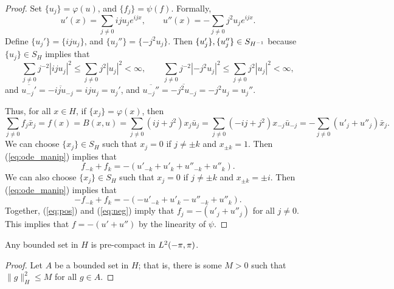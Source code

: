 \documentclass{homework}
\begin{document}
\begin{arabicparts}
\begin{proof}
			Set $\{u_j\} = \varphi(u)$, and $\{f_j\} = \psi(f)$. Formally,
			\begin{equation}
				\label{eq:formal_deriv}
				u'(x) = \sum_{j\ne0}iju_je^{ijx}, \qquad u''(x) = -\sum_{j\ne0}j^2u_je^{ijx}.
			\end{equation}
			Define $\{u_j'\} = \{iju_j\}$, and $\{u_j''\} = \{-j^2u_j\}$. Then $\{u_j'\}, \{u_j''\} \in S_{H^{-1}}$ because $\{u_j\} \in S_H$ implies that
			\begin{equation}
				\sum_{j\ne0}j^{-2}|iju_j|^2 \le \sum_{j\ne0} j^2|u_j|^2 < \infty, \qquad \sum_{j\ne0}j^{-2}|-j^2u_j|^2 \le \sum_{j\ne0}j^2|u_j|^2 < \infty,
			\end{equation}
			and $\overline{u_{-j}'} = \overline{-iju_{-j}} =iju_j=u_j'$, and $\overline{u_{-j}''} = \overline{-j^2u_{-j}} = -j^2u_j = u_j''$.
			
			Thus, for all $x\in H$, if $\{x_j\} = \varphi(x)$, then
			\begin{equation}
				\label{eq:ode_manip}
				 \sum_{j\ne0}f_j\bar{x}_j = f(x) = B(x,u)= \sum_{j\ne0}(ij + j^2)x_j\bar{u}_j = \sum_{j\ne 0}(-ij+j^2)x_{-j}\bar{u}_{-j} = -\sum_{j\ne0}(u'_j + u''_j)\bar{x}_j.
			\end{equation}
			We can choose $\{x_j\} \in S_H$ such that $x_j = 0$ if $j \ne \pm k$ and $x_{\pm k} = 1$. Then (\ref{eq:ode_manip}) implies that
			\begin{equation}
				\label{eq:pos}
				f_{-k} + f_k = -(u'_{-k} + u'_k + u''_{-k}+u''_k).
			\end{equation}
			We can also choose $\{x_j\} \in S_H$ such that $x_j = 0$ if $j\ne \pm k$ and $x_{\pm k} = \pm i$. Then (\ref{eq:ode_manip}) implies that
			\begin{equation}
				\label{eq:neg}
				-f_{-k} + f_k = -(-u'_{-k} + u'_k -u''_{-k} + u''_k).
			\end{equation}
			Together, (\ref{eq:pos}) and (\ref{eq:neg}) imply that $f_j = -(u'_j + u''_j)$ for all $j\ne0$. This implies that $f = -(u' + u'')$ by the linearity of $\psi$.
		
			\end{proof}	
		
		\questionpart
		Any bounded set in $H$ is pre-compact in ${L^2(-\pi,\pi)}$.
		
		\begin{proof}
			Let $A$ be a bounded set in $H$; that is, there is some $M > 0$ such that $\lVert g \rVert_H^2\le M$ for all $g \in A$.
			

\end{proof}
\end{arabicparts}
\end{document}
